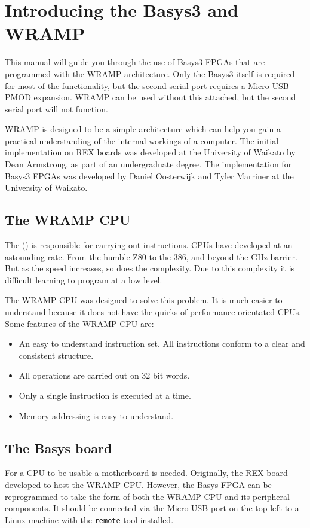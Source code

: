 \section{Introducing the Basys3 and WRAMP}

This manual will guide you through the use of Basys3 FPGAs that are programmed
with the WRAMP architecture. Only the Basys3 itself is required for most of the
functionality, but the second serial port requires a Micro-USB PMOD expansion.
WRAMP can be used without this attached, but the second serial port will not function.

WRAMP is designed to be a simple architecture which can help you gain a practical
understanding of the internal workings of a computer. The initial implementation
on REX boards was developed at the University of Waikato by Dean Armstrong, as
part of an undergraduate degree. The implementation for Basys3 FPGAs was developed
by Daniel Oosterwijk and Tyler Marriner at the University of Waikato.

\subsection{The WRAMP CPU}
The  () is responsible for carrying out 
instructions.
CPUs have developed at an astounding rate. From the humble Z80 to the 386, and
beyond the GHz barrier. But as the speed increases, so does
the complexity. Due to this complexity it is difficult learning to program
at a low level. 

The WRAMP CPU was designed to solve this problem. It is much easier to 
understand because it does not have the quirks of performance orientated CPUs.
Some features of the WRAMP CPU are:
\begin{itemize}
    \item An easy to understand instruction set. All instructions conform
            to a clear and consistent structure.
    \item All operations are carried out on 32 bit words.
    \item Only a single instruction is executed at a time.
    \item Memory addressing is easy to understand.
\end{itemize}

\subsection{The Basys board}
For a CPU to be usable a motherboard is needed. Originally, the REX board
developed to host the WRAMP CPU. However, the Basys FPGA can be reprogrammed
to take the form of both the WRAMP CPU and its peripheral components.
It should be connected via the Micro-USB port on the top-left to a Linux machine
with the \texttt{remote} tool installed.

